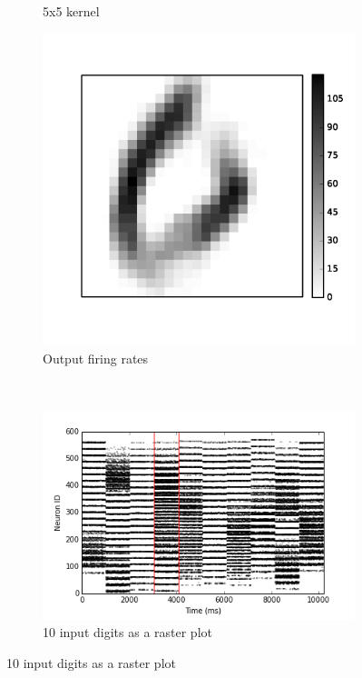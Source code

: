 \begin{figure}[bt!]
\begin{subfigure}[t]{0.3\textwidth}
		    \caption{5x5 kernel}
		    \label{Fig:63}
		\end{subfigure}
		\begin{subfigure}[t]{0.3\textwidth}
			\includegraphics[width=\textwidth]{pics_iconip/6-4.png}
		    \caption{Output firing rates}
		    \label{Fig:64}
		\end{subfigure}
		\\
		\begin{subfigure}[t]{0.4\textwidth}
			\includegraphics[width=\textwidth]{pics_iconip/6-1.png}
		    \caption{10 input digits as a raster plot}

\end{subfigure}
\end{figure}
